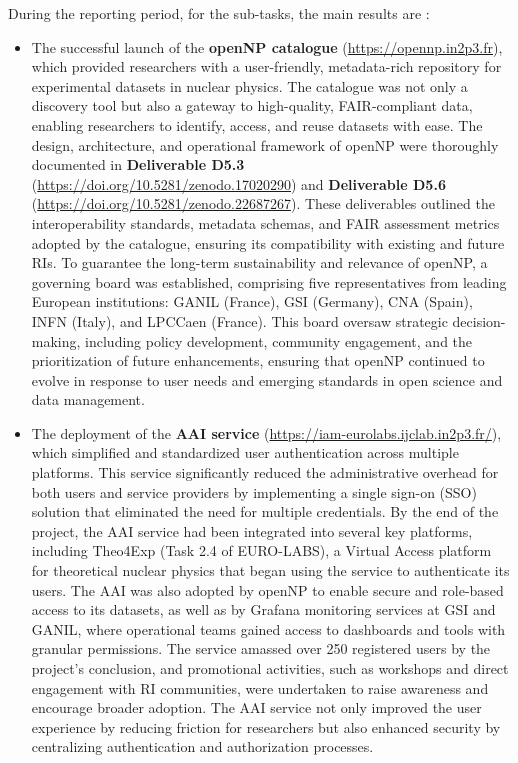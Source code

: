 During the reporting period, for the sub-tasks, the main results are :
\begin{itemize}
  
  \item The successful launch of the \textbf{openNP catalogue} (\url{https://opennp.in2p3.fr}), which provided researchers with a user-friendly, metadata-rich repository for experimental datasets in nuclear physics. The catalogue was not only a discovery tool but also a gateway to high-quality, FAIR-compliant data, enabling researchers to identify, access, and reuse datasets with ease. The design, architecture, and operational framework of openNP were thoroughly documented in \textbf{Deliverable D5.3} (\url{https://doi.org/10.5281/zenodo.17020290}) and \textbf{Deliverable D5.6} (\url{https://doi.org/10.5281/zenodo.22687267}). These deliverables outlined the interoperability standards, metadata schemas, and FAIR assessment metrics adopted by the catalogue, ensuring its compatibility with existing and future RIs. To guarantee the long-term sustainability and relevance of openNP, a governing board was established, comprising five representatives from leading European institutions: GANIL (France), GSI (Germany), CNA (Spain), INFN (Italy), and LPCCaen (France). This board oversaw strategic decision-making, including policy development, community engagement, and the prioritization of future enhancements, ensuring that openNP continued to evolve in response to user needs and emerging standards in open science and data management.
  \item The deployment of the \textbf{AAI service} (\url{https://iam-eurolabs.ijclab.in2p3.fr/}), which simplified and standardized user authentication across multiple platforms. This service significantly reduced the administrative overhead for both users and service providers by implementing a single sign-on (SSO) solution that eliminated the need for multiple credentials. By the end of the project, the AAI service had been integrated into several key platforms, including Theo4Exp (Task 2.4 of EURO-LABS), a Virtual Access platform for theoretical nuclear physics that began using the service to authenticate its users. The AAI was also adopted by openNP to enable secure and role-based access to its datasets, as well as by Grafana monitoring services at GSI and GANIL, where operational teams gained access to dashboards and tools with granular permissions. The service amassed over 250 registered users by the project's conclusion, and promotional activities, such as workshops and direct engagement with RI communities, were undertaken to raise awareness and encourage broader adoption. The AAI service not only improved the user experience by reducing friction for researchers but also enhanced security by centralizing authentication and authorization processes.

\end{itemize}
